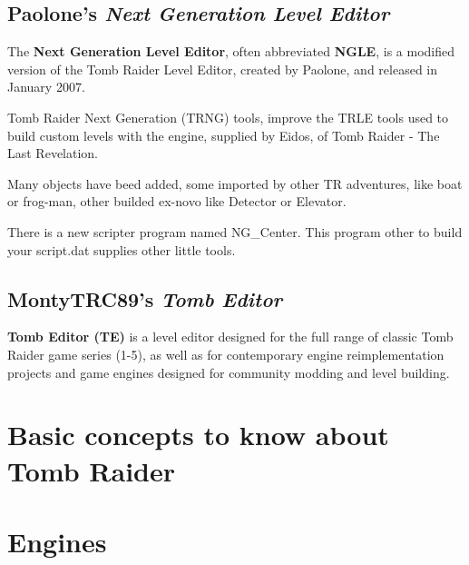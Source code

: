 \section{Paolone's \emph{Next Generation Level Editor}  }
The \textbf{Next Generation Level Editor}, often abbreviated \textbf{NGLE}, is a modified version of the Tomb Raider Level Editor, created by Paolone, and released in January 2007. \cite{wikiraider_NGLE}
\par Tomb Raider Next Generation  (TRNG)  tools, improve the TRLE tools used to build custom levels with the engine, supplied by Eidos, of Tomb Raider - The Last Revelation.
\par Many objects have beed added, some imported by other TR adventures, like boat or frog-man, other builded ex-novo like Detector or Elevator.
\par There is a new scripter program named NG\_Center. This program other to build your script.dat supplies other little tools. \cite{paolone_trng}
\section{MontyTRC89's \emph{Tomb Editor}}
\textbf{Tomb Editor (TE)} is a level editor designed for the full range of classic Tomb Raider game series (1-5), as well as for contemporary engine reimplementation projects and game engines designed for community modding and level building. \cite{TE_github}

\chapter{Basic concepts to know about Tomb Raider}

\chapter{Engines}


